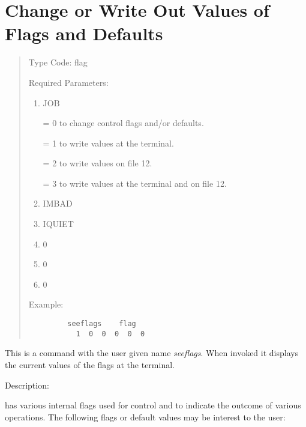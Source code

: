 \section{Change or Write Out Values of Flags and Defaults} 
\begin{quotation}
\noindent     Type Code:  flag
\vspace{5mm}

\noindent Required Parameters:
\begin{enumerate}
        \item  JOB

               = 0 to change control flags and/or defaults.

               = 1 to write values at the terminal.

               = 2 to write values on file 12.

               = 3 to write values at the terminal and on file 12.

        \item  IMBAD
        \item  IQUIET
        \item  0
        \item  0
        \item  0
\end{enumerate}
\vspace{5mm}
\noindent Example:
\begin{verbatim}
         seeflags    flag
           1  0  0  0  0  0
\end{verbatim}
\end{quotation}
This is a command with the user given name {\em seeflags}.  When invoked it displays the current values of the flags at the terminal.

\vspace{5mm}
     Description:
\vspace{2mm}

\Mary has various internal flags used for control and to indicate the outcome of various operations.  The following flags or default values may be interest to the user:


